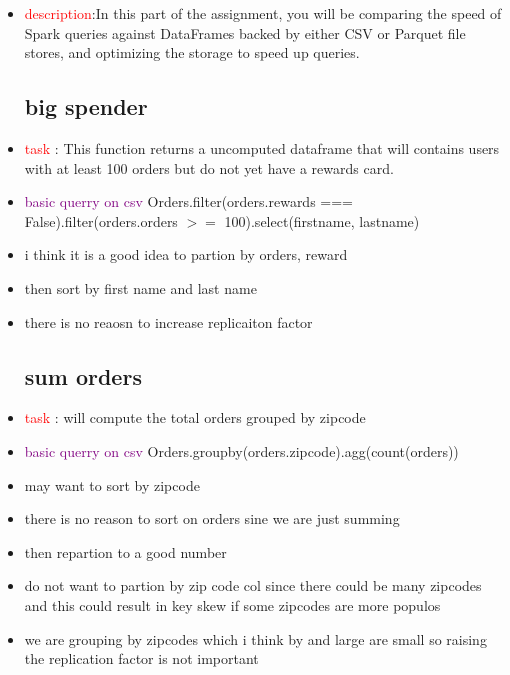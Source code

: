 \documentclass{article}
\begin{document}
\begin{itemize}
\item \textcolor{red}{description}:In this part of the assignment, you will be comparing the speed of Spark queries against DataFrames backed by either CSV or Parquet file stores, and optimizing the storage to speed up queries.
\subsection*{big spender}
\item \textcolor{red}{task }: This function returns a uncomputed dataframe that
will contains users with at least 100 orders but
do not yet have a rewards card.
\item \textcolor{purple}{basic querry on csv }Orders.filter(orders.rewards === False).filter(orders.orders $>=$ 100).select(firstname, lastname)
\item i think it is a good idea to partion by orders, reward
\item then sort by first name and last name 
\item there is no reaosn to increase replicaiton factor
\subsection*{sum orders}
\item \textcolor{red}{task }: will compute the total orders grouped by zipcode

\item \textcolor{purple}{basic querry on csv }Orders.groupby(orders.zipcode).agg(count(orders))
\item may want to sort by zipcode  
\item there is no reason to sort on orders sine we are just summing
\item then repartion to a good number
\item do not want to partion by zip code col since there could be many zipcodes and this could result in key skew if some zipcodes are more populos
\item we are grouping by zipcodes which i think by and large are small so raising the replication factor is not important 

\end{itemize}
\end{document}
